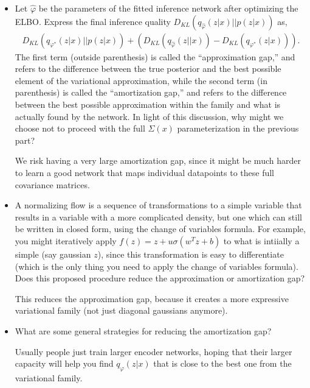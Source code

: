 \documentclass{article}
\begin{document}
\begin{enumerate}
\begin{itemize}
  \item Let $\hat{\varphi}$ be the parameters of the fitted inference network
    after optimizing the ELBO. Express the final inference quality
    $D_{KL}\left(q_{\hat{\varphi}}\left(z \vert x\right) \vert \vert p\left(z
    \vert x\right)\right)$ as,
    \begin{align*}
      D_{KL}\left(q_{\varphi^{\ast}}\left(z \vert x\right) \vert \vert p\left(z
      \vert x\right)\right) + \left(D_{KL}\left(q_{\hat{\varphi}}\left(z \vert
      \vert x\right)\right) - D_{KL}\left(q_{\varphi^{\ast}}\left(z \vert x
        \right)\right)\right).
    \end{align*}
    The first term (outside parenthesis) is called the ``approximation gap,''
    and refers to the difference between the true posterior and the best
    possible element of the variational approximation, while the second term (in
    parenthesis) is called the ``amortization gap,'' and refers to the
    difference between the best possible approximation within the family and
    what is actually found by the network. In light of this discussion, why
    might we choose not to proceed with the full $\Sigma\left(x\right)$
    parameterization in the previous part?

    We risk having a very large amortization gap, since it might be much harder
    to learn a good network that maps individual datapoints to these full
    covariance matrices.

  \item A normalizing flow is a sequence of transformations to a simple variable
    that results in a variable with a more complicated density, but one which
    can still be written in closed form, using the change of variables formula.
    For example, you might iteratively apply $f\left(z\right) = z +
    u\sigma\left(w^T z + b\right)$ to what is intiially a simple (say gaussian
    $z$), since this transformation is easy to differentiate (which is the only
    thing you need to apply the change of variables formula). Does this proposed
    procedure reduce the approximation or amortization gap?

    This reduces the approximation gap, because it creates a more expressive
    variational family (not just diagonal gaussians anymore).

  \item What are some general strategies for reducing the amortization gap?

    Usually people just train larger encoder networks, hoping that their larger capacity 
    will help you find $q_{\varphi}\left(z \vert x\right)$ that is close to the
    best one from the variational family.
  \end{itemize}
\end{enumerate}
\end{document}
